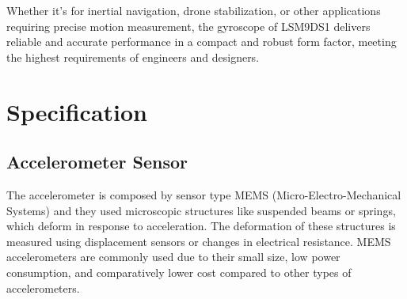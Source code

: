 \bigskip

Whether it's for inertial navigation, drone stabilization, or other applications requiring precise motion measurement, the gyroscope of LSM9DS1  delivers reliable and accurate performance in a compact and robust form factor, meeting the highest requirements of engineers and designers.

\begin{center}
    
    
    
    
\end{center}

\section{Specification}

\subsection{Accelerometer Sensor}

The accelerometer is composed by sensor type MEMS (Micro-Electro-Mechanical Systems) and they used microscopic structures like suspended beams or springs, which deform in response to acceleration. The deformation of these structures is measured using displacement sensors or changes in electrical resistance. MEMS accelerometers are commonly used due to their small size, low power consumption, and comparatively lower cost compared to other types of accelerometers.

